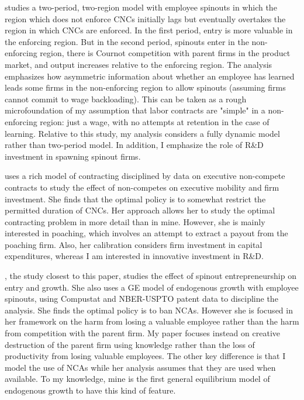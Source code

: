 \documentclass[11pt,english]{article}
\theoremstyle{remark}
\begin{document}
\cite{franco_covenants_2008} studies a two-period, two-region model with employee spinouts in which the region which does not enforce CNCs initially lags but eventually overtakes the region in which CNCs are enforced. In the first period, entry is more valuable in the enforcing region. But in the second period, spinouts enter in the non-enforcing region, there is Cournot competition with parent firms in the product market, and output increases relative to the enforcing region. The analysis emphasizes how asymmetric information about whether an employee has learned leads some firms in the non-enforcing region to allow spinouts (assuming firms cannot commit to wage backloading). This can be taken as a rough microfoundation of my assumption that labor contracts are "simple" in  a non-enforcing region: just a wage, with no attempts at retention in the case of learning. Relative to this study, my analysis considers a fully dynamic model rather than two-period model. In addition, I emphasize the role of R\&D investment in spawning spinout firms.

\cite{shi_restrictions_2018} uses a rich model of contracting disciplined by data on executive non-compete contracts to study the effect of non-competes on executive mobility and firm investment. She finds that the optimal policy is to somewhat restrict the permitted duration of CNCs. Her approach allows her to study the optimal contracting problem in more detail than in mine. However, she is mainly interested in poaching, which involves an attempt to extract a payout from the poaching firm. Also, her calibration considers firm investment in capital expenditures, whereas I am interested in innovative investment in R\&D.

\cite{baslandze_spinout_2019}, the study closest to this paper, studies the effect of spinout entrepreneurship on entry and growth. She also uses a GE model of endogenous growth with employee spinouts, using Compustat and NBER-USPTO patent data to discipline the analysis. She finds the optimal policy is to ban NCAs. However she is focused in her framework on the harm from losing a valuable employee rather than the harm from competition with the parent firm. My paper focuses instead on creative destruction of the parent firm using knowledge rather than the loss of productivity from losing valuable employees.  The other key difference is that I model the use of NCAs while her analysis assumes that they are used when available. To my knowledge, mine is the first general equilibrium model of endogenous growth to have this kind of feature.
\end{document}
